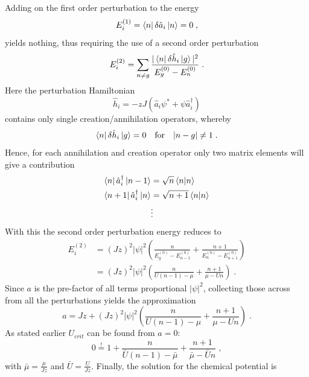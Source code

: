 Adding on the first order perturbation to the energy
\begin{equation}
	E_{i}^{(1)} = \bra{n} \delta \hat{a}_i \ket{n} = 0 \; ,
\end{equation}
yields nothing, thus requiring the use of a second order perturbation
\begin{equation}
	E_{i}^{(2)} = \sum_{n \neq g} \frac{|\bra{n} \delta \hat{h}_i \ket{g}|^2}{E_{g}^{(0)} - E_{n}^{(0)}} \; .
\end{equation}
Here the perturbation Hamiltonian
\begin{equation}
	\hat{h}_i = - z J \left( \hat{a}_i \psi^* + \psi \hat{a}_{i}^{\dag} \right)
\end{equation}
contains only single creation/annihilation operators, whereby
\begin{equation}
	\bra{n} \delta \hat{h}_i \ket{g} = 0 \quad \text{for} \quad |n - g| \neq 1 \; .
\end{equation}
Hence, for each annihilation and creation operator only two matrix elements will give a contribution
\begin{align*}
	\bra{n}  \hat{a}_{i}^{\dag} \ket{n-1} &= \sqrt{n} \braket{n|n} \\
	\bra{n+1}  \hat{a}_{i}^{\dag} \ket{n} &= \sqrt{n+1} \braket{n|n} \\
	& \vdots
\end{align*}
With this the second order perturbation energy reduces to
\begin{align}
	E_{i}^{(2)} &= \left( J z \right)^2 |\psi|^2 \left( \frac{n}{E_{g}^{(0)}- E_{n-1}^{(0)}} +  \frac{n+1}{E_{n}^{(0)}- E_{n+1}^{(0)}} \right) \nonumber \\
	&= \left( J z \right)^2 |\psi|^2 \left( \frac{n}{U(n-1) - \mu} + \frac{n+1}{\mu - U n} \right) \; .
\end{align}
Since $a$ is the pre-factor of all terms proportional $|\psi|^2$, collecting those across from all the perturbations yields the approximation 
\begin{equation}
	a = J z + \left( J z \right)^2 |\psi|^2 \left( \frac{n}{U(n-1) - \mu} + \frac{n+1}{\mu - U n} \right) \; .
\end{equation} 
As stated earlier $U_{crit}$ can be found from $a = 0$:
\begin{equation}
	0 \overset{!}{=} 1 + \frac{n}{\bar{U} (n-1) - \bar{\mu}} + \frac{n+1}{\bar{\mu} - \bar{U} n} \; ,
\end{equation}
with $\bar{\mu} = \frac{\mu}{J z}$ and $\bar{U} = \frac{U}{J z}$. Finally, the solution for the chemical potential is \cite{vanoosten}
